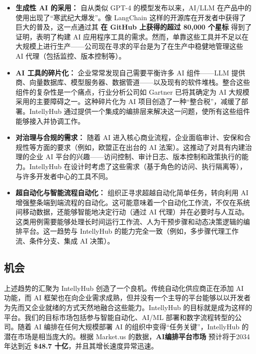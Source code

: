 \documentclass[11pt, a4paper, oneside]{article}
\begin{document}
\begin{itemize}
    \item \textbf{生成性 AI 的采用：} 自从类似 GPT-4 的模型发布以来，AI/LLM 在产品中的使用出现了“寒武纪大爆发”。像 LangChain 这样的开源库在开发者中获得了巨大的普及，这一点通过其 \textbf{在 GitHub 上获得的超过 80,000 个星标}\cite{langchainGitHub} 得到了证明，表明了构建 AI 应用程序工具的需求。然而，单靠这些工具并不足以在大规模上进行生产——公司现在寻求的平台是为了在生产中稳健地管理这些 AI 代理（包括监控、版本控制等）。
    
    \item \textbf{AI 工具的碎片化：} 企业常常发现自己需要平衡许多 AI 组件——LLM 提供商、向量数据库、模型服务器、数据管道——以及现有的软件堆栈。整合这些组件的复杂性是一个痛点，行业分析公司如 Gartner 已将其确定为 AI 大规模采用的主要障碍之一\cite{gartnerAIBarriers}。这种碎片化为 AI 项目创造了一种“整合税”，减缓了部署。IntellyHub 通过提供一个集成的编排层来解决这一问题，使所有这些组件能够接入并协调工作。
    
    \item \textbf{对治理与合规的需求：} 随着 AI 进入核心商业流程，企业面临审计、安保和合规性等方面的要求（例如，欧盟正在出台的 AI 法案\cite{euAIAct}）。这推动了对具有内建治理的企业 AI 平台的兴趣——访问控制、审计日志、版本控制和政策执行的能力。IntellyHub 在设计时考虑了这些需求（基于角色的访问、执行隔离等），与许多开发者中心的工具不同。
    
    \item \textbf{超自动化与智能流程自动化：} 组织正寻求超越自动化简单任务，转向利用 AI 增强整条端到端流程的自动化。这可能意味着一个自动化工作流，不仅在系统间移动数据，还能够智能地决定行动（通过 AI 代理）并在必要时与人互动。这类用例需要能够处理长时间运行工作流、人为干预步骤和动态决策逻辑的编排平台。这一趋势与 IntellyHub 的能力完全一致（例如，多步骤代理工作流、条件分支、集成 AI 决策）。
\end{itemize}

\subsection{机会}
上述趋势的汇聚为 IntellyHub 创造了一个良机。传统自动化供应商正在添加 AI 功能，而 AI 框架也在向企业需求成熟，但并没有一个主导的平台能够以以开发者为先而又企业就绪的方式天然地融合这些能力。IntellyHub 的目标就是成为这样的平台。我们的目标市场包括参与智能自动化、AI/ML 部署和数字流程转型的公司。随着 AI 编排在任何大规模部署 AI 的组织中变得“任务关键”，IntellyHub 的潜在市场是相当庞大的。根据 Market.us 的数据，\textbf{AI编排平台市场} 预计将于2034年达到近 \textbf{\$48.7 十亿}\cite{AIOrch}，并且其增长速度异常迅速。
\end{document}
